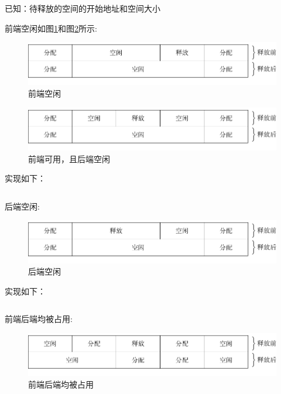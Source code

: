 已知：待释放的空间的开始地址和空间大小

\newpage

前端空闲如图\ref{fig:mem0}和图\ref{fig:mem1}所示: 

\begin{figure}[h]
  \centering
  \includegraphics[width=.7\textwidth]{fig/mem0.pdf}
  \caption{前端空闲}
  \label{fig:mem0}
\end{figure}

\begin{figure}[h]
  \centering
  \includegraphics[width=.7\textwidth]{fig/mem1.pdf}
  \caption{前端可用，且后端空闲}
  \label{fig:mem1}
\end{figure}

实现如下：

\begin{listing}[H]
  \inputminted[tabsize=2, firstline=98, lastline=116,
  linenos=true]{c}{../ZOS/src/kernel/memory.c}
\end{listing}

后端空闲:

\begin{figure}[h]
  \centering
  \includegraphics[width=.7\textwidth]{fig/mem2.pdf}
  \caption{后端空闲}
  \label{fig:mem3}
\end{figure}

实现如下：

\begin{listing}[H]
  \inputminted[tabsize=2, firstline=118, lastline=127,
  linenos=true]{c}{../ZOS/src/kernel/memory.c}
\end{listing}

前端后端均被占用:

\begin{figure}[h]
  \centering
  \includegraphics[width=.7\textwidth]{fig/mem3.pdf}
  \caption{前端后端均被占用}
  \label{fig:mem4}
\end{figure}

